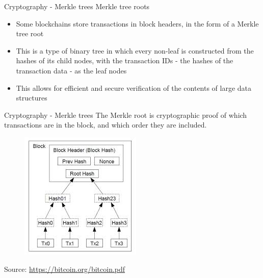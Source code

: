 \documentclass[11pt]{beamer}
\begin{document}

\begin{frame}{Cryptography - Merkle trees}
	Merkle tree roots
	\begin{itemize}
		\item Some blockchains store transactions in block headers, in the form of a Merkle tree root
		\item This is a type of binary tree in which every non-leaf is constructed from the hashes of its child nodes, with the transaction IDs - the hashes of the transaction data - as the leaf nodes
		\item This allows for efficient and secure verification of the contents of large data structures
	\end{itemize}
\end{frame}


\begin{frame}{Cryptography - Merkle trees}
	The Merkle root is cryptographic proof of which transactions are in the block, and which order they are included.
	\begin{figure}[]
		\centering
		\includegraphics  [scale=0.5]{Images/images}
	\end{figure}
	\begin{tiny}
		Source: \href{https://bitcoin.org/bitcoin.pdf}{https://bitcoin.org/bitcoin.pdf}
	\end{tiny}
\end{frame}

\end{document}
